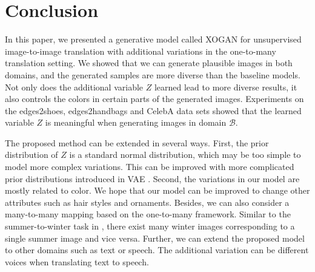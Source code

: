 \documentclass[conference]{IEEEtran}
\theoremstyle{definition}
\begin{document}
\section{Conclusion}
\label{sec-conclude}
In this paper, we presented a generative model called XOGAN for unsupervised image-to-image translation with additional variations in the
one-to-many translation setting. We showed that we can generate plausible images in both domains, and the generated samples are more diverse than
the baseline models. Not only does the additional variable $Z$ learned lead to more diverse results, it also controls the colors in certain parts
of the generated images. Experiments on the {\sf edges2shoes}, {\sf edges2handbags} and {\sf CelebA} data sets showed that the learned variable $Z$ is meaningful when generating images in domain $\mathcal B$.

The proposed method can be extended in several ways. First, the prior distribution of $Z$ is a standard normal distribution, which may be too
simple to model more complex variations. This can be improved with more complicated prior distributions introduced in VAE
\cite{kingma2016improved, maaloe2016auxiliary}. Second, the variations in our model are mostly related to color. We hope that our model can be
improved to change other attributes such as hair styles and ornaments.
Besides, we can also consider a many-to-many mapping based on the one-to-many framework. Similar to the summer-to-winter task in
\cite{zhu2017unpaired}, there exist many winter images corresponding to a single summer image and vice versa. Further, we can extend the proposed
model to other domains such as text or speech.  The additional variation can be different voices when translating text to speech. 





\end{document}
